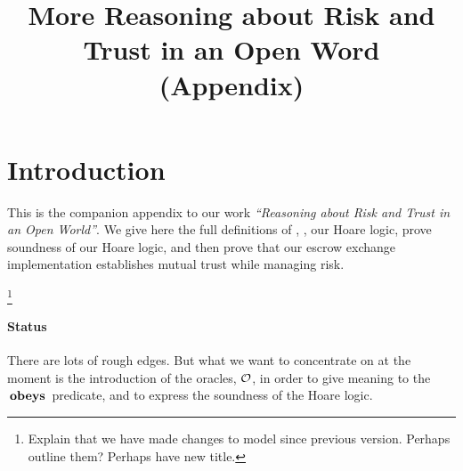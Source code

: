 \documentclass[preprint,10pt]{sigplanconf}
\begin{document}
 \title{More Reasoning about Risk and Trust  in an Open Word\\
(Appendix)}

\maketitle






\section{Introduction}

This is the companion appendix to our work \textit{``Reasoning about
  Risk and Trust in an Open World''}. We give here the full
definitions of \LangOO, \Chainmail, our Hoare logic, prove
soundness of our Hoare logic, and then prove that our escrow exchange
implementation establishes mutual trust while managing risk.

\footnote{Explain that we have made changes to model since  previous version.  Perhaps outline them? Perhaps
have new title.}

\paragraph{Status} There are lots of rough  edges. But what we want to concentrate on at the moment is the introduction of the oracles, ${\cal O}$, in order to give meaning to the $\,\textbf{\textrm{obeys}}\,$ predicate, and to express the soundness of the Hoare logic.
\end{document}

